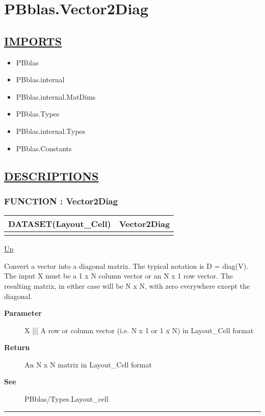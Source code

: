 \chapter*{PBblas.Vector2Diag}
\hypertarget{ecldoc:toc:PBblas.Vector2Diag}{}

\section*{\underline{IMPORTS}}
\begin{itemize}
\item PBblas
\item PBblas.internal
\item PBblas.internal.MatDims
\item PBblas.Types
\item PBblas.internal.Types
\item PBblas.Constants
\end{itemize}

\section*{\underline{DESCRIPTIONS}}
\subsection*{FUNCTION : Vector2Diag}
\hypertarget{ecldoc:pbblas.vector2diag}{}

{\renewcommand{\arraystretch}{1.5}
\begin{tabularx}{\textwidth}{|>{\raggedright\arraybackslash}l|X|}
\hline
\hspace{0pt}DATASET(Layout\_Cell) & Vector2Diag \\
\hline
\multicolumn{2}{|>{\raggedright\arraybackslash}X|}{\hspace{0pt}(DATASET(Layout\_Cell) X)} \\
\hline
\end{tabularx}
}

\hyperlink{ecldoc:toc:PBblas}{Up}

\par
Convert a vector into a diagonal matrix. The typical notation is D = diag(V). The input X must be a 1 x N column vector or an N x 1 row vector. The resulting matrix, in either case will be N x N, with zero everywhere except the diagonal.

\par
\begin{description}
\item [\textbf{Parameter}] X ||| A row or column vector (i.e. N x 1 or 1 x N) in Layout\_Cell format
\item [\textbf{Return}] An N x N matrix in Layout\_Cell format
\item [\textbf{See}] PBblas/Types.Layout\_cell
\end{description}

\rule{\textwidth}{0.4pt}
